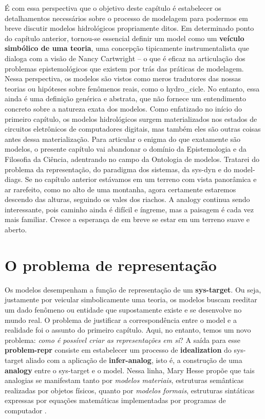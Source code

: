 \documentclass[./main.tex]{subfiles}
\begin{document}
\par É com essa perspectiva que o objetivo deste capítulo é estabelecer os detalhamentos necessários sobre o processo de modelagem para podermos em breve discutir modelos hidrológicos propriamente ditos. Em determinado ponto do capítulo anterior, tornou-se essencial definir um \gls{model} como um \textbf{veículo simbólico de uma teoria}, uma concepção tipicamente instrumentalista que dialoga com a visão de Nancy Cartwright \cite{nancy1983} -- o que é eficaz na articulação dos problemas epistemológicos que existem por trás das práticas de modelagem. Nessa perspectiva, os modelos são vistos como meros tradutores das nossas teorias ou hipóteses sobre fenômenos reais, como o \gls{hydro_cicle}. No entanto, essa ainda é uma definição genérica e abstrata, que não fornece um entendimento concreto sobre a natureza exata dos modelos. Como enfatizado no início do primeiro capítulo, os modelos hidrológicos surgem materializados nos estados de circuitos eletrônicos de computadores digitais, mas também eles são outras coisas antes dessa materialização. Para articular o enigma do que exatamente são modelos, o presente capítulo vai abandonar o domínio da Epistemologia e da Filosofia da Ciência, adentrando no campo da Ontologia de modelos. Tratarei do problema da representação, do \gls{paradigma} dos sistemas, da \gls{sys-dyn} e do \gls{model-diags}. Se no capítulo anterior estávamos em um terreno com vista panorâmica e ar rarefeito, como no alto de uma montanha, agora certamente estaremos descendo das alturas, seguindo os vales dos riachos. A \gls{analogy} continua sendo interessante, pois caminho ainda é difícil e íngreme, mas a paisagem é cada vez mais familiar. Cresce a esperança de em breve se estar em um terreno suave e aberto.

\section{O problema de representação} \label{sec:sys:represent}

\par Os modelos desempenham a função de representação de um \textbf{\gls{sys-target}}. Ou seja, justamente por veicular simbolicamente uma \gls{teoria}, os modelos buscam reeditar um dado fenômeno ou entidade que supostamente existe e se desenvolve no mundo real. O problema de justificar a correspondência entre o \gls{model} e a realidade foi o assunto do primeiro capítulo. Aqui, no entanto, temos um novo problema: \textit{como é possível criar as representações em si}? A saída para esse \textbf{\gls{problem-repr}} consiste em estabelecer um processo de \textbf{\gls{idealization}} do \gls{sys-target} aliado com a aplicação de \textbf{\gls{infer-analog}}, isto é, a construção de uma \textbf{\gls{analogy}} entre o \gls{sys-target} e o \gls{model}. Nessa linha, Mary Hesse propõe que tais analogias se manifestam tanto por \textit{modelos materiais}, estruturas semânticas realizadas por objetos físicos, quanto por \textit{modelos formais}, estruturas sintáticas expressas por equações matemáticas implementadas por programas de computador \cite{hesse2017}.
\end{document}
